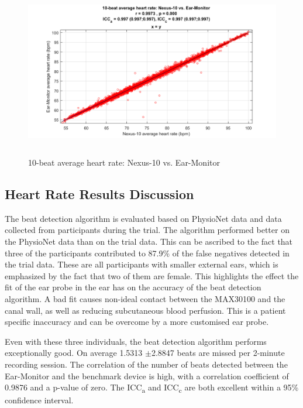 \begin{figure}[H]
   \centering
   \includegraphics[width=12cm,height=7.5cm]{figs/HeartRateScatter.png}
   \caption{10-beat average heart rate: Nexus-10 vs. Ear-Monitor}
   \label{fig:HeartRateScatter}
\end{figure}

\subsection{Heart Rate Results Discussion}
The beat detection algorithm is evaluated based on PhysioNet data and data collected from participants during the trial. The algorithm performed better on the PhysioNet data than on the trial data. This can be ascribed to the fact that three of the participants contributed to 87.9\% of the false negatives detected in the trial data. These are all participants with smaller external ears, which is emphasized by the fact that two of them are female. This highlights the effect the fit of the ear probe in the ear has on the accuracy of the beat detection algorithm. A bad fit causes non-ideal contact between the MAX30100 and the canal wall, as well as reducing subcutaneous blood perfusion.  This is a patient specific inaccuracy and can be overcome by a more customised ear probe.

\medskip

Even with these three individuals, the beat detection algorithm performs exceptionally good. On average 1.5313 $\pm$2.8847 beats are missed per 2-minute recording session. The correlation of the number of beats detected between the Ear-Monitor and the benchmark device is high, with a correlation coefficient of 0.9876 and a p-value of zero. The ICC\textsubscript{a} and ICC\textsubscript{c} are both excellent within a 95\% confidence interval.

